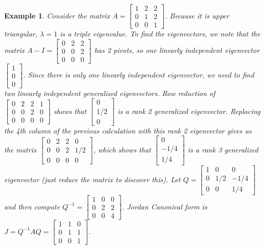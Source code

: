 \documentclass[10pt]{article}
\theoremstyle{plain}
\theoremstyle{box}
\newtheorem{example}{Example}
\begin{document}
\begin{example}
Consider the matrix 
$ A=\begin{bmatrix} 
1&2&2\\
0&1&2\\
0&0&1
\end{bmatrix} 
$.  Because it is upper triangular, $\lambda = 1$ is a triple eigenvalue. To find the eigenvectors, we note that the matrix 
$A-I= \begin{bmatrix} 
0&2&2\\
0&0&2\\
0&0&0
\end{bmatrix} 
$
has 2 pivots, so one linearly independent eigenvector 
$\begin{bmatrix} 
1\\
0\\
0
\end{bmatrix}$. 
Since there is only one linearly independent eigenvector, we need to find two linearly independent generalized eigenvectors. Row reduction of $\begin{bmatrix} 
0&2&2&1\\
0&0&2&0\\
0&0&0&0
\end{bmatrix}$ 
shows that  
$\begin{bmatrix} 
0\\
1/2\\
0
\end{bmatrix}$ is a rank 2 generalized eigenvector. Replacing the 4th column of the previous calculation with this rank 2 eigenvector gives us the matrix 
$\begin{bmatrix} 
0&2&2&0\\
0&0&2&1/2\\
0&0&0&0
\end{bmatrix}$, which shows that $\begin{bmatrix} 
0\\
-1/4\\
1/4
\end{bmatrix}$ is a rank 3 generalized eigenvector (just reduce the matrix to discover this).
Let $Q=\begin{bmatrix} 
1&0&0\\
0&1/2&-1/4\\
0&0&1/4
\end{bmatrix} 
$ and then compute $Q^{-1} = \begin{bmatrix} 
1&0&0\\
0&2&2\\
0&0&4
\end{bmatrix} 
$. 
Jordan Canonical form is $J=Q^{-1}AQ=\begin{bmatrix} 
1&1&0\\
0&1&1\\
0&0&1
\end{bmatrix} 
$. 



\end{example}
\end{document}
